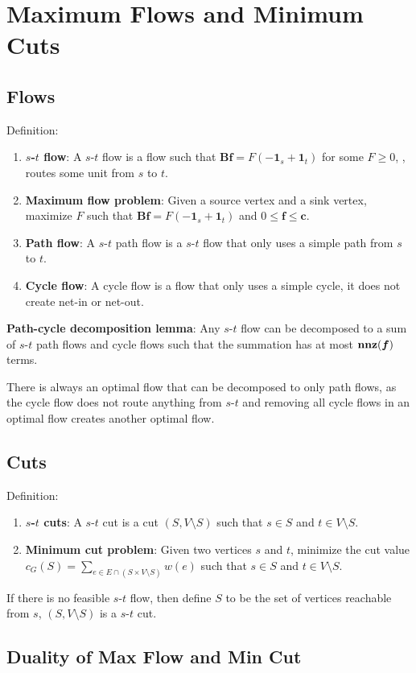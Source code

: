 \section{Maximum Flows and Minimum Cuts}

\subsection{Flows}
Definition:
\begin{enumerate}
    \item \textbf{$s$-$t$ flow}: A $s$-$t$ flow is a flow such that $\boldsymbol{B}\boldsymbol{f} = F (-\boldsymbol{1}_s + \boldsymbol{1}_t)$ for some $F\ge 0$, \ie, routes some unit from $s$ to $t$.
    \item \textbf{Maximum flow problem}: Given a source vertex and a sink vertex, maximize $F$ such that $\boldsymbol{B}\boldsymbol{f} = F (-\boldsymbol{1}_s + \boldsymbol{1}_t)$ and $0 \le \boldsymbol{f} \le \boldsymbol{c}$.
    \item \textbf{Path flow}: A $s$-$t$ path flow is a $s$-$t$ flow that only uses a simple path from $s$ to $t$.
    \item \textbf{Cycle flow}: A cycle flow is a flow that only uses a simple cycle, it does not create net-in or net-out.
\end{enumerate}

\textbf{Path-cycle decomposition lemma}: Any $s$-$t$ flow can be decomposed to a sum of $s$-$t$ path flows and cycle flows such that the summation has at most $\operatorname{\textbf{nnz}}(\boldsymbol{f})$ terms.

There is always an optimal flow that can be decomposed to only path flows, as the cycle flow does not route anything from $s$-$t$ and removing all cycle flows in an optimal flow creates another optimal flow.

\subsection{Cuts}

Definition:
\begin{enumerate}
    \item \textbf{$s$-$t$ cuts}: A $s$-$t$ cut is a cut $(S, V\setminus S)$ such that $s \in S$ and $t \in V\setminus S$.
    \item \textbf{Minimum cut problem}: Given two vertices $s$ and $t$, minimize the cut value $c_G(S)=\sum_{e \in E \cap (S\times V\setminus S)} w(e)$ such that $s \in S$ and $t \in V\setminus S$.
\end{enumerate}

If there is no feasible $s$-$t$ flow, then define $S$ to be the set of vertices reachable from $s$, $(S, V\setminus S)$ is a $s$-$t$ cut.

\subsection{Duality of Max Flow and Min Cut}